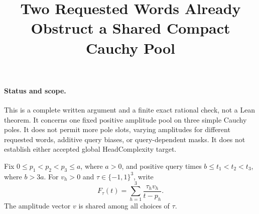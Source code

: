 \documentclass[11pt]{article}
\title{Two Requested Words Already Obstruct a Shared Compact Cauchy Pool}
\author{}
\date{}
\begin{document}
\maketitle

\paragraph{Status and scope.}
This is a complete written argument and a finite exact rational check,
not a Lean theorem. It concerns one fixed positive amplitude pool on
three simple Cauchy poles. It does not permit more pole slots, varying
amplitudes for different requested words, additive query biases, or
query-dependent masks. It does not establish either accepted global
HeadComplexity target.

Fix $0\leq p_1<p_2<p_3\leq a$, where $a>0$, and positive query
times $b\leq t_1<t_2<t_3$, where $b>3a$. For $v_h>0$ and
$\tau\in\{-1,1\}^3$, write
\[
 F_\tau(t)=\sum_{h=1}^3\frac{\tau_hv_h}{t-p_h}.
\]
The amplitude vector $v$ is shared among all choices of $\tau$.
\end{document}
